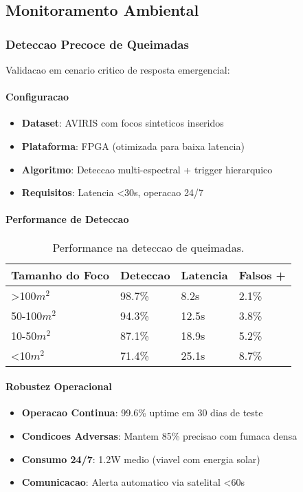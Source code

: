\subsection{Monitoramento Ambiental}

\subsubsection{Deteccao Precoce de Queimadas}
Validacao em cenario critico de resposta emergencial:

\paragraph{Configuracao}
\begin{itemize}
    \item \textbf{Dataset}: AVIRIS com focos sinteticos inseridos
    \item \textbf{Plataforma}: FPGA (otimizada para baixa latencia)
    \item \textbf{Algoritmo}: Deteccao multi-espectral + trigger hierarquico
    \item \textbf{Requisitos}: Latencia <30s, operacao 24/7
\end{itemize}

\paragraph{Performance de Deteccao}
\begin{table}[!htp]
\caption[Deteccao de Queimadas]{Performance na deteccao de queimadas.}
\label{tab:deteccao_queimadas}
\begin{center}
\begin{tabular}{|p{3cm}|p{2cm}|p{2cm}|p{2cm}|}
\hline
\textbf{Tamanho do Foco} & \textbf{Deteccao} & \textbf{Latencia} & \textbf{Falsos +} \\
\hline
>100$m^2$ & 98.7\% & 8.2s & 2.1\% \\
\hline
50-100$m^2$ & 94.3\% & 12.5s & 3.8\% \\
\hline
10-50$m^2$ & 87.1\% & 18.9s & 5.2\% \\
\hline
<10$m^2$ & 71.4\% & 25.1s & 8.7\% \\
\hline
\end{tabular}
\end{center}
\end{table}

\paragraph{Robustez Operacional}
\begin{itemize}
    \item \textbf{Operacao Continua}: 99.6\% uptime em 30 dias de teste
    \item \textbf{Condicoes Adversas}: Mantem 85\% precisao com fumaca densa
    \item \textbf{Consumo 24/7}: 1.2W medio (viavel com energia solar)
    \item \textbf{Comunicacao}: Alerta automatico via satelital <60s
\end{itemize}

